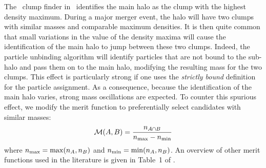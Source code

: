 The \phew\ clump finder in \ramses\ identifies the main halo as the
clump with the highest density maximum.  During a major merger event,
the halo will have two clumps with similar masses and comparable
maximum densities.  It is then quite common that small variations in
the value of the density maxima will cause the identification of the
main halo to jump between these two clumps.  Indeed, the particle
unbinding algorithm will identify particles that are not bound to the
sub-halo and pass them on to the main halo, modifying the resulting
mass for the two clumps.  This effect is particularly strong if one
uses the {\it strictly bound} definition for the particle
assignment. As a consequence, because the identification of the main
halo varies, strong mass oscillations are expected. To counter this
spurious effect, we modify the merit function to preferentially select candidates with
similar masses:
\begin{equation}
\mathcal{M}(A,B) = \frac{n_{A \cap B}}{n_{\rm max} - n_{\rm min}} \label{eq:merit}
\end{equation}
where $n_{\rm max}=\max(n_A,n_B)$ and $n_{\rm min}=\min(n_A,n_B)$.  An
overview of other merit functions used in the literature is given in
Table~1 of \cite{SUSSING_COMPARISON}.
